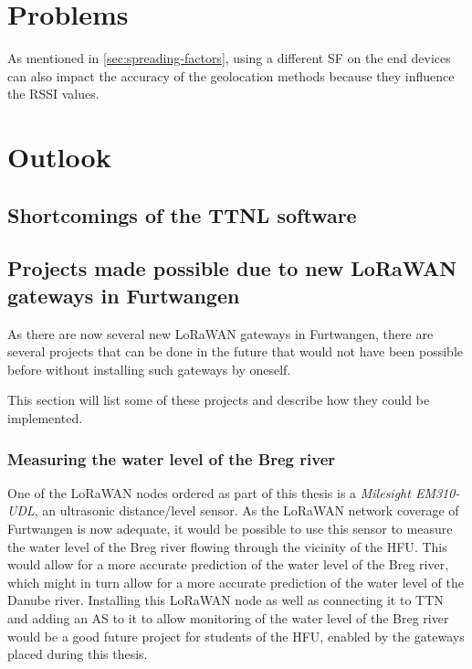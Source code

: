 \section{Problems}


As mentioned in \cref{sec:spreading-factors}, using a different \ac{SF} on the end devices can also impact the accuracy of the geolocation methods because they influence the \ac{RSSI} values.

\section{Outlook}


\subsection{Shortcomings of the \acf{TTNL} software}


\subsection{Projects made possible due to new \acs{LoRaWAN} gateways in Furtwangen}


As there are now several new \ac{LoRaWAN} gateways in Furtwangen, there are several projects that can be done in the future that would not have been possible before without installing such gateways by oneself.

This section will list some of these projects and describe how they could be implemented.

\subsubsection{Measuring the water level of the Breg river}

One of the \ac{LoRaWAN} nodes ordered as part of this thesis is a \emph{Milesight EM310-UDL}, an ultrasonic distance/level sensor.
As the \ac{LoRaWAN} network coverage of Furtwangen is now adequate, it would be possible to use this sensor to measure the water level of the Breg river flowing through the vicinity of the \ac{HFU}.
This would allow for a more accurate prediction of the water level of the Breg river, which might in turn allow for a more accurate prediction of the water level of the Danube river.
Installing this \ac{LoRaWAN} node as well as connecting it to \ac{TTN} and adding an \acf{AS} to it to allow monitoring of the water level of the Breg river would be a good future project for students of the \ac{HFU}, enabled by the gateways placed during this thesis.

